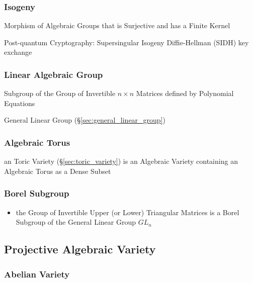\subsubsection{Isogeny}\label{sec:isogeny}

Morphism of Algebraic Groups that is Surjective and has a Finite Kernel

Post-quantum Cryptography: Supersingular Isogeny Diffie-Hellman (SIDH) key
exchange



\subsubsection{Linear Algebraic Group}\label{sec:linear_algebraic_group}

Subgroup of the Group of Invertible $n \times n$ Matrices defined by Polynomial
Equations

General Linear Group (\S\ref{sec:general_linear_group})



\subsubsection{Algebraic Torus}\label{sec:algebraic_torus}

an Toric Variety (\S\ref{sec:toric_variety}) is an Algebraic Variety containing
an Algebraic Torus as a Dense Subset



\subsubsection{Borel Subgroup}\label{sec:borel_subgroup}

\begin{itemize}
  \item the Group of Invertible Upper (or Lower) Triangular Matrices is a Borel
    Subgroup of the General Linear Group $GL_n$
\end{itemize}



\subsection{Projective Algebraic Variety}
\label{sec:projective_algebraic_variety}

\subsubsection{Abelian Variety}\label{sec:abelian_variety}

